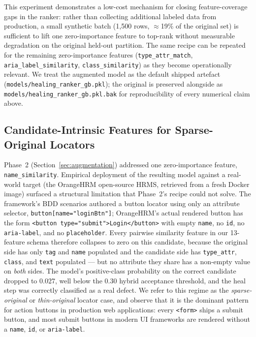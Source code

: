 \documentclass[conference]{IEEEtran}
\begin{document}
This experiment demonstrates a low-cost mechanism for closing feature-coverage gaps in the ranker: rather than collecting additional labeled data from production, a small synthetic batch (1{,}500 rows, $\approx$19\% of the original set) is sufficient to lift one zero-importance feature to top-rank without measurable degradation on the original held-out partition. The same recipe can be repeated for the remaining zero-importance features (\texttt{type\_attr\_match}, \texttt{aria\_label\_similarity}, \texttt{class\_similarity}) as they become operationally relevant. We treat the augmented model as the default shipped artefact (\texttt{models/healing\_ranker\_gb.pkl}); the original is preserved alongside as \texttt{models/healing\_ranker\_gb.pkl.bak} for reproducibility of every numerical claim above.

\subsection{Candidate-Intrinsic Features for Sparse-Original Locators}
\label{sec:candidate_intrinsic}

Phase~2 (Section~\ref{sec:augmentation}) addressed one zero-importance feature, \texttt{name\_similarity}. Empirical deployment of the resulting model against a real-world target (the OrangeHRM open-source HRMS, retrieved from a fresh Docker image) surfaced a structural limitation that Phase~2's recipe could not solve. The framework's BDD scenarios authored a button locator using only an attribute selector, \texttt{button[name="loginBtn"]}; OrangeHRM's actual rendered button has the form \texttt{<button type="submit">Login</button>} with empty \texttt{name}, no \texttt{id}, no \texttt{aria-label}, and no \texttt{placeholder}. Every pairwise similarity feature in our 13-feature schema therefore collapses to zero on this candidate, because the original side has only \texttt{tag} and \texttt{name} populated and the candidate side has \texttt{type\_attr}, \texttt{class}, and \texttt{text} populated --- but no attribute they share has a non-empty value on \emph{both} sides. The model's positive-class probability on the correct candidate dropped to 0.027, well below the 0.30 hybrid acceptance threshold, and the heal step was correctly classified as a real defect. We refer to this regime as the \emph{sparse-original} or \emph{thin-original} locator case, and observe that it is the dominant pattern for action buttons in production web applications: every \texttt{<form>} ships a submit button, and most submit buttons in modern UI frameworks are rendered without a \texttt{name}, \texttt{id}, or \texttt{aria-label}.
\end{document}
